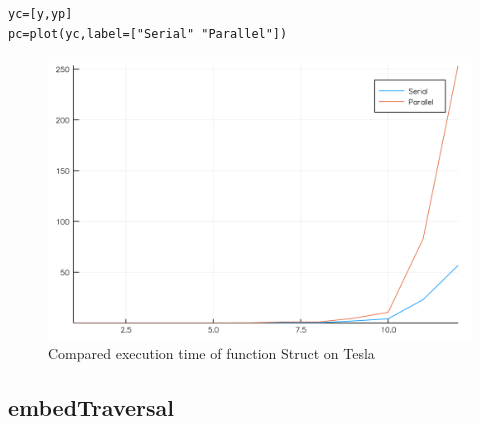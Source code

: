 \documentclass[a4paper,12pt]{article}
\begin{document}

\begin{Verbatim}[fontsize=\footnotesize]
yc=[y,yp]
pc=plot(yc,label=["Serial" "Parallel"])
\end{Verbatim}
\begin{figure}[!h]
\centering
\includegraphics[scale=0.08]{compstruct.png}
\caption{Compared execution time of function Struct  on Tesla}
\end{figure}

\newpage


\subsection{embedTraversal}
\end{document}
